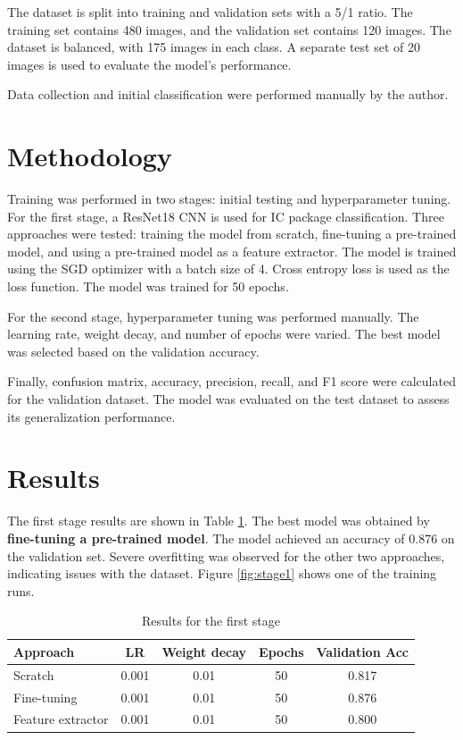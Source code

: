 \documentclass[preprint,12pt,3p,times]{elsarticle}
\begin{document}
\vspace{0.5cm}
The dataset is split into training and validation sets with a 5/1 ratio. The training set contains 480 images, and the validation set contains 120 images. The dataset is balanced, with 175 images in each class. A separate test set of 20 images is used to evaluate the model's performance.

Data collection and initial classification were performed manually by the author.

\section{Methodology}
Training was performed in two stages: initial testing and hyperparameter tuning.
For the first stage, a ResNet18 CNN is used for IC package classification. Three approaches were tested: training the model from scratch, fine-tuning a pre-trained model, and using a pre-trained model as a feature extractor. The model is trained using the SGD optimizer with a batch size of 4. Cross entropy loss is used as the loss function. The model was trained for 50 epochs.

For the second stage, hyperparameter tuning was performed manually. The learning rate, weight decay, and number of epochs were varied. The best model was selected based on the validation accuracy.

Finally, confusion matrix, accuracy, precision, recall, and F1 score were calculated for the validation dataset. The model was evaluated on the test dataset to assess its generalization performance.

\section{Results}
The first stage results are shown in Table \ref{tab:stage1}. The best model was obtained by \textbf{fine-tuning a pre-trained model}. The model achieved an accuracy of 0.876 on the validation set. Severe overfitting was observed for the other two approaches, indicating issues with the dataset. Figure \ref{fig:stage1} shows one of the training runs.

\begin{table}[H]
	\centering
	\begin{tabular}{|l|c|c|c|c|}
	\hline
	\textbf{Approach} & \textbf{LR} & \textbf{Weight decay} & \textbf{Epochs} & \textbf{Validation Acc} \\ \hline
	Scratch & 0.001 & 0.01 & 50 & 0.817 \\ \hline
	Fine-tuning & 0.001 & 0.01 & 50 & 0.876 \\ \hline
	Feature extractor & 0.001 & 0.01 & 50 & 0.800 \\ \hline
	\end{tabular}
	\caption{Results for the first stage}
	\label{tab:stage1}
\end{table}
\end{document}
